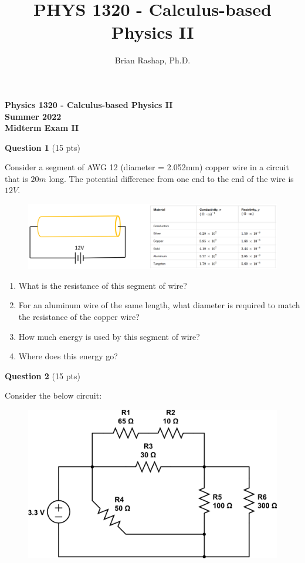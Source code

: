 \documentclass[14pt]{report}
\author{Brian Rashap, Ph.D.}
\title{PHYS 1320 - Calculus-based Physics II}
\begin{document}
\begin{center}
\textbf{Physics 1320 - Calculus-based Physics II \\ Summer 2022 \\ Midterm Exam II}
\end{center}

\textbf{Question 1} (15 pts)

Consider a segment of AWG 12 (diameter = 2.052mm) copper wire in a circuit that is $20m$ long. The potential difference from one end to the end of the wire is $12V$.

\begin{figure}[H]
\begin{center}
\includegraphics[scale=0.55]{exam2_1.png}
\end{center}
\end{figure}

\begin{enumerate}[label=\Alph*]
\item What is the resistance of this segment of wire?
\item For an aluminum wire of the same length, what diameter is required to match the resistance of the copper wire?
\item How much energy is used by this segment of wire?
\item Where does this energy go?
\end{enumerate}

\textbf{Question 2} (15 pts)

Consider the below circuit:

\begin{figure}[H]
\begin{center}
\includegraphics[scale=0.40]{circuit_2_2.png}
\end{center}
\end{figure}
\end{document}
